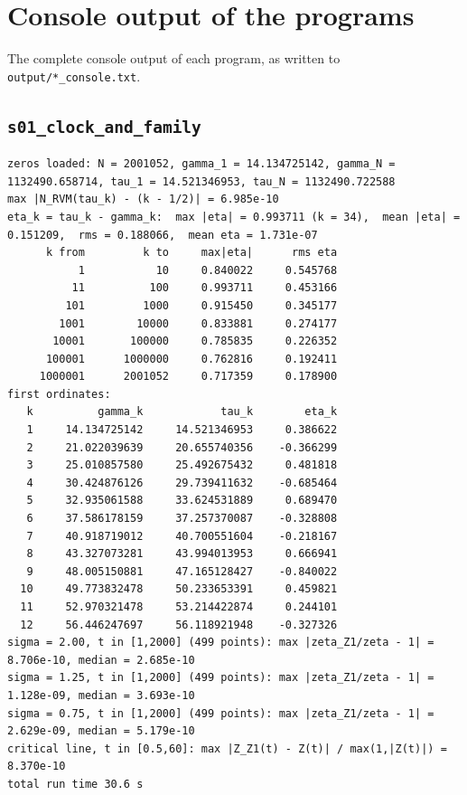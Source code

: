 \documentclass[11pt,reqno]{amsart}
\numberwithin{equation}{section}
\theoremstyle{plain}
\theoremstyle{definition}
\theoremstyle{remark}
\begin{document}
\section{Console output of the programs}
\label{app:output}

The complete console output of each program, as written to \texttt{output/*\_console.txt}.

\subsection{\texttt{s01\_clock\_and\_family}}
\label{app:out-s01-clock-and-family}

\begin{lstlisting}[style=out]
zeros loaded: N = 2001052, gamma_1 = 14.134725142, gamma_N = 1132490.658714, tau_1 = 14.521346953, tau_N = 1132490.722588
max |N_RVM(tau_k) - (k - 1/2)| = 6.985e-10
eta_k = tau_k - gamma_k:  max |eta| = 0.993711 (k = 34),  mean |eta| = 0.151209,  rms = 0.188066,  mean eta = 1.731e-07
      k from         k to     max|eta|      rms eta
           1           10     0.840022     0.545768
          11          100     0.993711     0.453166
         101         1000     0.915450     0.345177
        1001        10000     0.833881     0.274177
       10001       100000     0.785835     0.226352
      100001      1000000     0.762816     0.192411
     1000001      2001052     0.717359     0.178900
first ordinates:
   k          gamma_k            tau_k        eta_k
   1     14.134725142     14.521346953     0.386622
   2     21.022039639     20.655740356    -0.366299
   3     25.010857580     25.492675432     0.481818
   4     30.424876126     29.739411632    -0.685464
   5     32.935061588     33.624531889     0.689470
   6     37.586178159     37.257370087    -0.328808
   7     40.918719012     40.700551604    -0.218167
   8     43.327073281     43.994013953     0.666941
   9     48.005150881     47.165128427    -0.840022
  10     49.773832478     50.233653391     0.459821
  11     52.970321478     53.214422874     0.244101
  12     56.446247697     56.118921948    -0.327326
sigma = 2.00, t in [1,2000] (499 points): max |zeta_Z1/zeta - 1| = 8.706e-10, median = 2.685e-10
sigma = 1.25, t in [1,2000] (499 points): max |zeta_Z1/zeta - 1| = 1.128e-09, median = 3.693e-10
sigma = 0.75, t in [1,2000] (499 points): max |zeta_Z1/zeta - 1| = 2.629e-09, median = 5.179e-10
critical line, t in [0.5,60]: max |Z_Z1(t) - Z(t)| / max(1,|Z(t)|) = 8.370e-10
total run time 30.6 s
\end{lstlisting}
\end{document}
